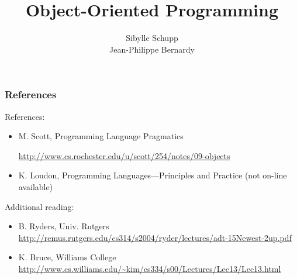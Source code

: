 \documentclass{beamer}
\title[OOP]
{Object-Oriented Programming}
\subtitle{} %
\author[Jean-Philippe Bernardy] %
{Sibylle Schupp\inst{2} \\
Jean-Philippe Bernardy\inst{1}}
\institute[Universities of Somewhere and Elsewhere] 
{
  \inst{1}%
  Department of Computing Science\\
  Chalmers University of Technology\\
  \inst{2}%
  Institute for Software Systems\\
  Hamburg University of Technology
}
\date%
\begin{document}
\begin{frame}
  \titlepage
\end{frame}

\begin{frame}[fragile]
\frametitle{References}
References:
\begin{itemize}
\item M. Scott, Programming Language Pragmatics

\url{http://www.cs.rochester.edu/u/scott/254/notes/09-objects}
\item K. Loudon, Programming Languages---Principles and Practice
(not on-line available)
\end{itemize}

Additional reading:
\begin{itemize}
\item B. Ryders, Univ. Rutgers
\url{
http://remus.rutgers.edu/cs314/s2004/ryder/lectures/adt-15Newest-2up.pdf
}
%
\item K. Bruce, Williams College
\url{
http://www.cs.williams.edu/~kim/cs334/s00/Lectures/Lec13/Lec13.html}
\end{itemize}
\end{frame}

\end{document}
